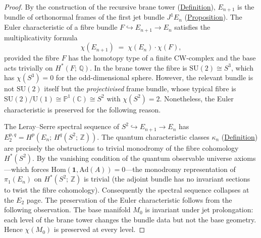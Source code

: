 \begin{proof}
By the construction of the recursive brane tower
(\hyperref[def:recursive-brane-tower]{Definition}), $E_{n+1}$ is the bundle of
orthonormal frames of the first jet bundle $J^1 E_n$
(\hyperref[prop:jet-prolongation]{Proposition}).  The Euler characteristic of a
fibre bundle $F \hookrightarrow E_{n+1} \to E_n$ satisfies the
multiplicativity formula
\[
\chi(E_{n+1}) \;=\; \chi(E_n) \cdot \chi(F),
\]
provided the fibre $F$ has the homotopy type of a finite CW-complex and the
base acts trivially on $H^*(F;\, \mathbb{Q})$.  In the brane tower the fibre
is $\mathrm{SU}(2) \cong S^3$, which has $\chi(S^3) = 0$ for the odd-dimensional
sphere.  However, the relevant bundle is not $\mathrm{SU}(2)$ itself but the
\emph{projectivised} frame bundle, whose typical fibre is
$\mathrm{SU}(2)/\mathrm{U}(1) \cong \mathbb{P}^1(\mathbb{C}) \cong S^2$ with
$\chi(S^2) = 2$.  Nonetheless, the Euler characteristic is preserved for the
following reason.

The Leray--Serre spectral sequence of
$S^2 \hookrightarrow E_{n+1} \to E_n$ has $E_2^{p,q} = H^p(E_n;\,
H^q(S^2;\, \mathbb{Z}))$.  The quantum characteristic classes $\kappa_n$
(\hyperref[def:quantum-characteristic-classes]{Definition}) are precisely the
obstructions to trivial monodromy of the fibre cohomology $H^*(S^2)$.  By
the vanishing condition of the quantum observable universe axioms---which
forces $\mathrm{Hom}(\mathbf{1}, \mathrm{Ad}(A)) = 0$---the monodromy
representation of $\pi_1(E_n)$ on $H^*(S^2;\, \mathbb{Z})$ is trivial (the
adjoint bundle has no invariant sections to twist the fibre cohomology).
Consequently the spectral sequence collapses at the $E_2$ page.  The
preservation of the Euler characteristic follows from the following
observation.  The base manifold $M_0$ is invariant under jet prolongation:
each level of the brane tower changes the bundle data but not the base
geometry.  Hence $\chi(M_0)$ is preserved at every level.
\end{proof}

